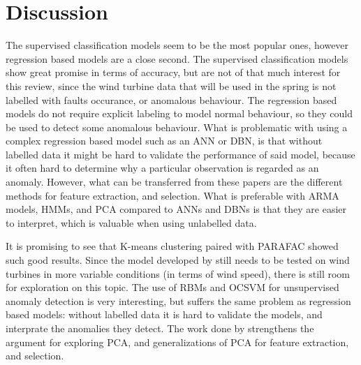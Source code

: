 \section{Discussion}
The supervised classification models seem to be the most popular ones, however regression based models are a close second. 
The supervised classification models show great promise in terms of accuracy, but are not of that much interest for this review, since the wind turbine data that will be used in the spring is not labelled with faults occurance, or anomalous behaviour. 
The regression based models do not require explicit labeling to model normal behaviour, so they could be used to detect some anomalous behaviour. 
What is problematic with using a complex regression based model such as an ANN or DBN, is that without labelled data it might be hard to validate the performance of said model, because it often hard to determine why a particular observation is regarded as an anomaly. 
However, what can be transferred from these papers are the different methods for feature extraction, and selection. 
What is preferable with ARMA models, HMMs, and PCA compared to ANNs and DBNs is that they are easier to interpret, which is valuable when using unlabelled data. \bigskip

It is promising to see that K-means clustering paired with PARAFAC showed such good results. 
Since the model developed by \textcite{fault_detect_PARAFAC_k_means} still needs to be tested on wind turbines in more variable conditions (in terms of wind speed), there is still room for exploration on this topic. 
The use of RBMs and OCSVM for unsupervised anomaly detection is very interesting, but suffers the same problem as regression based models: without labelled data it is hard to validate the models, and interprate the anomalies they detect. 
The work done by \textcite{multiway_PCA_multivar_inference_cm_wt} strengthens the argument for exploring PCA, and generalizations of PCA for feature extraction, and selection.
